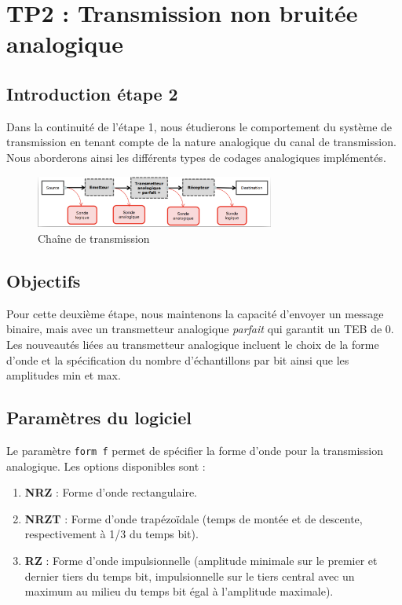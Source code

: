 \section{TP2 : Transmission non bruitée analogique}

\subsection{Introduction étape 2}
Dans la continuité de l'étape 1, nous étudierons le comportement du système de transmission en tenant compte de la nature analogique du canal de transmission. Nous aborderons ainsi les différents types de codages analogiques implémentés.

\begin{figure}[H]
    \centering
    \includegraphics[width=0.7\textwidth]{img/etape2_chaine_transmission.png}
    \caption{Chaîne de transmission}
    \label{fig:teb1}
\end{figure}

\subsection{Objectifs}
Pour cette deuxième étape, nous maintenons la capacité d'envoyer un message binaire, mais avec un transmetteur analogique \textit{parfait} qui garantit un TEB de 0. Les nouveautés liées au transmetteur analogique incluent le choix de la forme d'onde et la spécification du nombre d'échantillons par bit ainsi que les amplitudes min et max.

\subsection{Paramètres du logiciel}
Le paramètre \texttt{form f} permet de spécifier la forme d'onde pour la transmission analogique. Les options disponibles sont :

\begin{enumerate}
    \item \textbf{NRZ} : Forme d'onde rectangulaire.
    \item \textbf{NRZT} : Forme d'onde trapézoïdale (temps de montée et de descente, respectivement à 1/3 du temps bit).
    \item \textbf{RZ} : Forme d'onde impulsionnelle (amplitude minimale sur le premier et dernier tiers du temps bit, impulsionnelle sur le tiers central avec un maximum au milieu du temps bit égal à l'amplitude maximale).
\end{enumerate}

